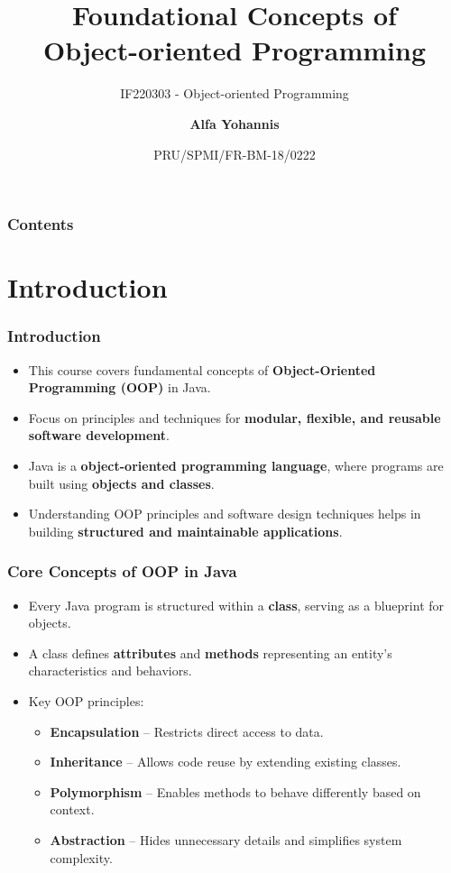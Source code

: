 \documentclass[aspectratio=169, table]{beamer}
\subtitle{IF220303 - Object-oriented Programming}
\title{\LARGE Foundational Concepts of\\Object-oriented Programming \vspace{10pt}}
\date[Serial]{\scriptsize {PRU/SPMI/FR-BM-18/0222}}
\author[Pradita]{\small {\textbf{Alfa Yohannis}}}
\begin{document}
	
	\frame{\titlepage}
%	
%	
	
\begin{frame}[fragile]
	\frametitle{Contents}
	\tableofcontents
\end{frame}


\section{Introduction}

\begin{frame}[fragile]
	\frametitle{Introduction}
	
	\begin{itemize}
		\item This course covers fundamental concepts of \textbf{Object-Oriented Programming (OOP)} in Java.
		\item Focus on principles and techniques for \textbf{modular, flexible, and reusable software development}.
		\item Java is a \textbf{object-oriented programming language}, where programs are built using \textbf{objects and classes}.
		\item Understanding OOP principles and software design techniques helps in building \textbf{structured and maintainable applications}.
	\end{itemize}
\end{frame}

\begin{frame}[fragile]
	\frametitle{Core Concepts of OOP in Java}
	
	\begin{itemize}
		\item Every Java program is structured within a \textbf{class}, serving as a blueprint for objects.
		\item A class defines \textbf{attributes} and \textbf{methods} representing an entity’s characteristics and behaviors.
		\item Key OOP principles:
		\begin{itemize}
			\item \textbf{Encapsulation} – Restricts direct access to data.
			\item \textbf{Inheritance} – Allows code reuse by extending existing classes.
			\item \textbf{Polymorphism} – Enables methods to behave differently based on context.
			\item \textbf{Abstraction} – Hides unnecessary details and simplifies system complexity.
		\end{itemize}
	\end{itemize}
\end{frame}
\end{document}
